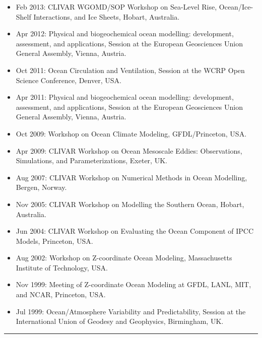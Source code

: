\begin{itemize}[leftmargin=*]
\item Feb 2013: {\sc CLIVAR WGOMD/SOP Workshop on Sea-Level Rise, Ocean/Ice-Shelf Interactions, and Ice Sheets}, Hobart, Australia.  

\item Apr 2012: {\sc Physical and biogeochemical ocean modelling: development, assessment, and applications}, Session at the European Geosciences Union General Assembly, Vienna, Austria.

\item Oct 2011: {\sc Ocean Circulation and Ventilation}, Session at the WCRP Open Science Conference, Denver, USA. 

\item Apr 2011: {\sc Physical and biogeochemical ocean modelling: development, assessment, and applications}, Session at the European Geosciences Union General Assembly, Vienna, Austria.

\item Oct 2009: {\sc Workshop on Ocean Climate Modeling},
  GFDL/Princeton, USA.

 \item Apr 2009: {\sc CLIVAR Workshop on Ocean Mesoscale Eddies: Observations, Simulations, and Parameterizations}, Exeter, UK.

\item Aug 2007: {\sc CLIVAR Workshop on Numerical Methods in Ocean Modelling}, Bergen, Norway.

\item Nov 2005: {\sc CLIVAR Workshop on Modelling the Southern Ocean}, Hobart, Australia.

\item Jun 2004: {\sc CLIVAR Workshop on Evaluating the Ocean
  Component of IPCC Models}, Princeton, USA.

\item Aug 2002: {\sc Workshop on Z-coordinate Ocean Modeling}, Massachusetts Institute of Technology, USA.

\item Nov 1999: {\sc Meeting of Z-coordinate Ocean Modeling at GFDL, LANL, MIT, and NCAR}, Princeton, USA.

\item Jul 1999: {\sc Ocean/Atmosphere Variability and
  Predictability}, Session at the International Union of Geodesy and Geophysics, Birmingham, UK.

\end{itemize}




\noindent\rule{\textwidth}{1pt}
\vspace{-1cm}
